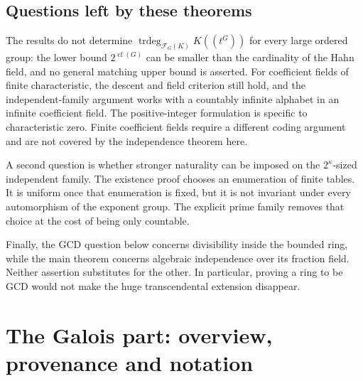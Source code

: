 \documentclass[11pt,letterpaper]{article}
\theoremstyle{definition}
\theoremstyle{remark}
\newcommand{\trdeg}{\operatorname{trdeg}}
\newcommand{\cof}{\operatorname{cf}}
\newcommand{\HH}[2]{#1((t^{#2}))}
\newcommand{\FF}[2]{\mathcal F_{#2}(#1)}
\newcounter{bstgrsavedequation}
\begin{document}
\subsection{Questions left by these theorems}

The results do not determine
$\trdeg_{\FF KG}\HH KG$ for every large ordered group: the lower bound
$2^{\cof(G)}$ can be smaller than the cardinality of the Hahn field, and no
general matching upper bound is asserted. For coefficient fields of finite
characteristic, the descent and field criterion still hold, and the
independent-family argument works with a countably infinite alphabet in an
infinite coefficient field. The positive-integer formulation is specific
to characteristic zero. Finite coefficient fields require a different
coding argument and are not covered by the independence theorem here.

A second question is whether stronger naturality can be imposed on the
$2^\kappa$-sized independent family. The existence proof chooses an
enumeration of finite tables. It is uniform once that enumeration is
fixed, but it is not invariant under every automorphism of the exponent
group. The explicit prime family removes that choice at the cost of being
only countable.

Finally, the GCD question below concerns divisibility inside the bounded
ring, while the main theorem concerns algebraic independence over its
fraction field. Neither assertion substitutes for the other. In
particular, proving a ring to be GCD would not make the huge transcendental
extension disappear.

\setcounter{bstgrsavedequation}{\value{equation}}
\let\bstgrsavedtheequation\theequation
\let\bstgrsavedtheHequation\theHequation
{}
\renewcommand{\theequation}{\thesection.\arabic{equation}}
\renewcommand{\theHequation}{bstgr.\thesection.\arabic{equation}}

\section{The Galois part: overview, provenance and notation}\label{bst:gr:sec:overview}
\end{document}
